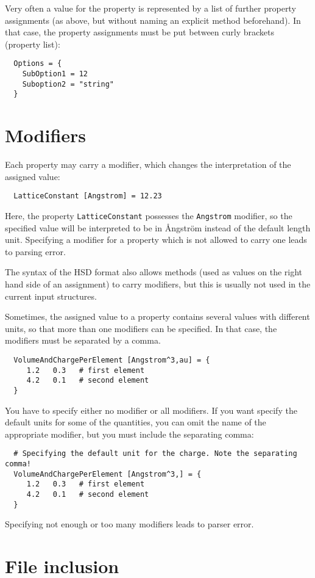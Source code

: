 Very often a value for the property is represented by a list of
further property assignments (as above, but without naming an
explicit method beforehand). In that case, the property assignments must
be put between curly brackets (property list):
\begin{verbatim}
  Options = {
    SubOption1 = 12
    Suboption2 = "string"
  }
\end{verbatim}


\section{Modifiers}

Each property may carry a modifier, which changes the interpretation
of the assigned value:
\begin{verbatim}
  LatticeConstant [Angstrom] = 12.23
\end{verbatim}
Here, the property \verb|LatticeConstant| possesses the \verb|Angstrom|
modifier, so the specified value will be interpreted to be in
\AA{}ngstr\"om instead of the default length unit. Specifying a modifier
for a property which is not allowed to carry one leads to parsing error.

The syntax of the HSD format also allows methods (used as values on the right
hand side of an assignment) to carry modifiers, but this is usually not used in
the current input structures.

Sometimes, the assigned value to a property contains several values
with different units, so that more than one modifiers can be
specified. In that case, the modifiers must be separated by a comma.
\begin{verbatim}
  VolumeAndChargePerElement [Angstrom^3,au] = {
     1.2   0.3   # first element
     4.2   0.1   # second element
  }
\end{verbatim}
You have to specify either no modifier or all modifiers. If you want
specify the default units for some of the quantities, you can omit the
name of the appropriate modifier, but you must include the separating
comma:
\begin{verbatim}
  # Specifying the default unit for the charge. Note the separating comma!
  VolumeAndChargePerElement [Angstrom^3,] = {
     1.2   0.3   # first element
     4.2   0.1   # second element
  }
\end{verbatim}
Specifying not enough or too many modifiers leads to parser error.

\section{File inclusion}

